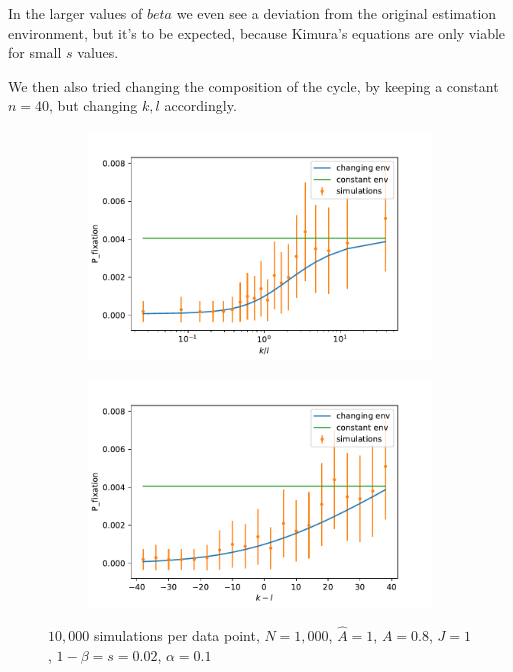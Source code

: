 \documentclass[11pt]{article}
\begin{document}
In the larger values of $beta$ we even see a deviation from the original estimation environment, but it's to be expected, because Kimura's equations are only viable for small $s$ values.

We then also tried changing the composition of the cycle, by keeping a constant $n=40$, but changing $k,l$ accordingly.

\begin{figure}[t]
  \begin{center}
  \begin{subfigure}[a]{0.49\linewidth}
    \includegraphics[width=\linewidth]{../figures/changed_env/ch_env_var_k_div_l.pdf}
   \end{subfigure}
   \begin{subfigure}[a]{0.49\linewidth}
    \includegraphics[width=\linewidth]{../figures/changed_env/ch_env_var_k_min_l.pdf}
   \end{subfigure}
  \end{center}
  \caption{$10,000$ simulations per data point, $N=1,000$, $\hat{A}=1$, $A=0.8$, $J=1$, $1-\beta=s=0.02$, $\alpha=0.1$}
  \label{fig:ch_env_k_l}
\end{figure}
\end{document}
